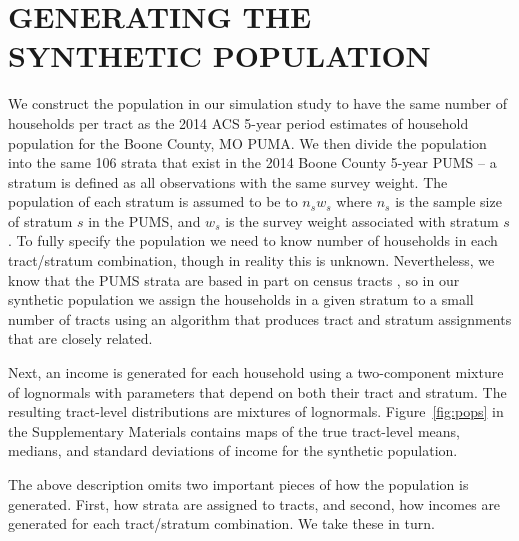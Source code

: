\documentclass[12pt]{article}
\begin{document}
\section{GENERATING THE SYNTHETIC POPULATION}\label{app:synpop}
\setcounter{table}{0}
We construct the population in our simulation study to have the same number of households per tract as the 2014 ACS 5-year period estimates of household population for the Boone County, MO PUMA. We then divide the population into the same 106 strata that exist in the 2014 Boone County 5-year PUMS -- a stratum is defined as all observations with the same survey weight. The population of each stratum is assumed to be to $n_sw_s$ where $n_s$ is the sample size of stratum $s$ in the PUMS, and $w_s$ is the survey weight associated with stratum $s$. To fully specify the population we need to know number of households in each tract/stratum combination, though in reality this is unknown. Nevertheless, we know that the PUMS strata are based in part on census tracts \citep{acs2015}, so in our synthetic population we assign the households in a given stratum to a small number of tracts using an algorithm that produces tract and stratum assignments that are closely related.

Next, an income is generated for each household using a two-component mixture of lognormals with parameters that depend on both their tract and stratum. The resulting tract-level distributions are mixtures of lognormals. Figure~\ref{fig:pops} in the Supplementary Materials contains maps of the true tract-level means, medians, and standard deviations of income for the synthetic population.

The above description omits two important pieces of how the population is generated. First, how strata are assigned to tracts, and second, how incomes are generated for each tract/stratum combination. We take these in turn.
\end{document}
